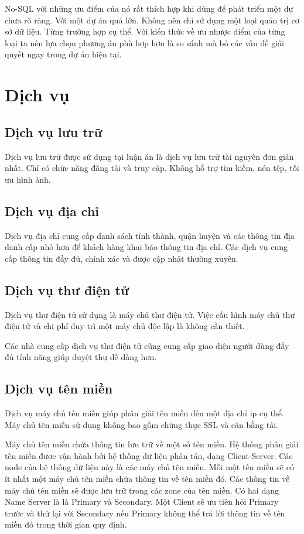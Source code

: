 \documentclass[11pt]{report}
\begin{document}
	No-SQL với những ưu điểm của nó rất thích hợp khi dùng để phát triển một dự chưa rõ ràng. Với một dự án quá lớn. Không nên chỉ sử dụng một loại quản trị cơ sở dữ liệu. Từng trường hợp cụ thể. Với kiến thức về ưu nhược điểm của từng loại ta nên lựa chọn phương án phù hợp hơn là so sánh mà bỏ các vấn đề giải quyết ngay trong dự án hiện tại.
	
	\section{Dịch vụ}
	\subsection{Dịch vụ lưu trữ}
	Dịch vụ lưu trữ được sử dụng tại luận án là dịch vụ lưu trữ tài nguyên đơn giản nhất. Chỉ có chức năng đăng tải và truy cập. Không hỗ trợ tìm kiếm, nén tệp, tối ưu hình ảnh.
	
	\subsection{Dịch vụ địa chỉ}
	Dịch vụ địa chỉ cung cấp danh sách tỉnh thành, quận huyện và các thông tin địa danh cấp nhỏ hơn để khách hàng khai báo thông tin địa chỉ. Các dịch vụ cung cấp thông tin đầy đủ, chính xác và được cập nhật thường xuyên.
	
	\subsection{Dịch vụ thư điện tử}
	Dịch vụ thư điện tử sử dụng là máy chủ thư điện tử. Việc cấu hình máy chủ thư điện tử và chi phí duy trì một máy chủ độc lập là không cần thiết.
	
	Các nhà cung cấp dịch vụ thư điện tử cũng cung cấp giao diện người dùng đầy đủ tính năng giúp duyệt thư dễ dàng hơn.
	
	\subsection{Dịch vụ tên miền}
	Dịch vụ máy chủ tên miền giúp phân giải tên miền đến một địa chỉ ip cụ thể. Máy chủ tên miền sử dụng không bao gồm chứng thực SSL và cân bằng tải.
	
	Máy chủ tên miền chứa thông tin lưu trữ về một số tên miền. Hệ thống phân giải tên miền được vận hành bởi hệ thống dữ liệu phân tán, dạng Client-Server. Các node của hệ thống dữ liệu này là các máy chủ tên miền. Mỗi một tên miền sẽ có ít nhất một máy chủ tên miền chứa thông tin về tên miền đó. Các thông tin về máy chủ tên miền sẽ được lưu trữ trong các zone của tên miền. Có hai dạng Name Server là là Primary và Secondary. Một Client sẽ ưu tiên hỏi Primary trước và thử lại với Secondary nếu Primary không thể trả lời thông tin về tên miền đó trong thời gian quy định.
	
\end{document}
